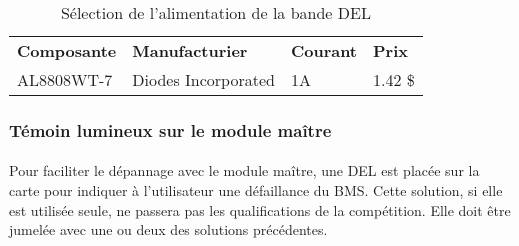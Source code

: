 	\begin{table}[H]
		\centering
		\caption{Sélection de l'alimentation de la bande DEL}
		\label{LedDriver}
		\renewcommand{\arraystretch}{1.3}
		\begin{tabular}{|p{3cm}|p{4cm}|p{2cm}|p{1.5cm}|}
			\hline
			\textbf{Composante} & \textbf{Manufacturier} & \textbf{Courant} & \textbf{Prix}
			\\ \hhline{|=|=|=|=|}
			AL8808WT-7 & Diodes Incorporated  & 1A & 1.42 \$ \\ \hline		
		\end{tabular}
	\end{table}		

	\subsubsection{Témoin lumineux sur le module maître}
		\paragraph*{}
		Pour faciliter le dépannage avec le module maître, une DEL est placée sur la carte pour indiquer à l'utilisateur une défaillance du BMS. Cette solution, si elle est utilisée seule, ne passera pas les qualifications de la compétition. Elle doit être jumelée avec une ou deux des solutions précédentes.
		
